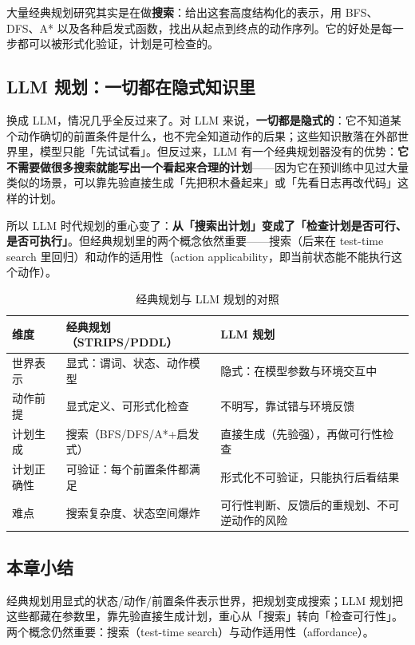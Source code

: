 \documentclass[a4paper]{article}
\begin{document}
大量经典规划研究其实是在做\textbf{搜索}：给出这套高度结构化的表示，用 BFS、DFS、A* 以及各种启发式函数，找出从起点到终点的动作序列。它的好处是每一步都可以被形式化验证，计划是可检查的。

\subsection{LLM 规划：一切都在隐式知识里}

换成 LLM，情况几乎全反过来了。对 LLM 来说，\textbf{一切都是隐式的}：它不知道某个动作确切的前置条件是什么，也不完全知道动作的后果；这些知识散落在外部世界里，模型只能「先试试看」。但反过来，LLM 有一个经典规划器没有的优势：\textbf{它不需要做很多搜索就能写出一个看起来合理的计划}——因为它在预训练中见过大量类似的场景，可以靠先验直接生成「先把积木叠起来」或「先看日志再改代码」这样的计划。

所以 LLM 时代规划的重心变了：\textbf{从「搜索出计划」变成了「检查计划是否可行、是否可执行」}。但经典规划里的两个概念依然重要——搜索（后来在 test-time search 里回归）和动作的适用性（action applicability，即当前状态能不能执行这个动作）。

\begin{table}[H]
\centering
\caption{经典规划与 LLM 规划的对照}
\begin{tabular}{@{}p{}p{}p{}@{}}
\toprule
维度 & 经典规划（STRIPS/PDDL） & LLM 规划 \\
\midrule
世界表示 & 显式：谓词、状态、动作模型 & 隐式：在模型参数与环境交互中 \\
动作前提 & 显式定义、可形式化检查 & 不明写，靠试错与环境反馈 \\
计划生成 & 搜索（BFS/DFS/A*+启发式） & 直接生成（先验强），再做可行性检查 \\
计划正确性 & 可验证：每个前置条件都满足 & 形式化不可验证，只能执行后看结果 \\
难点 & 搜索复杂度、状态空间爆炸 & 可行性判断、反馈后的重规划、不可逆动作的风险 \\
\bottomrule
\end{tabular}
\end{table}

\subsection{本章小结}
经典规划用显式的状态/动作/前置条件表示世界，把规划变成搜索；LLM 规划把这些都藏在参数里，靠先验直接生成计划，重心从「搜索」转向「检查可行性」。两个概念仍然重要：搜索（test-time search）与动作适用性（affordance）。
\end{document}
